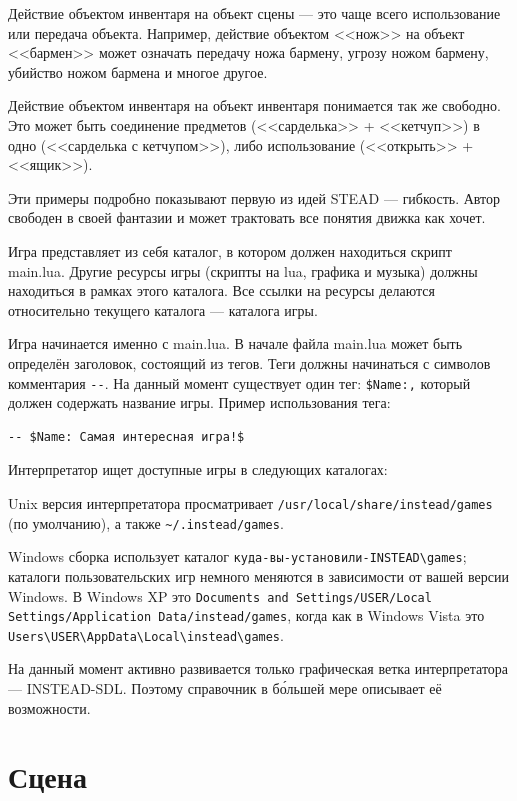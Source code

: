 \documentclass[a4paper,12pt]{article}
\begin{document}
Действие объектом инвентаря на объект сцены --- это чаще всего использование или передача объекта. Например, действие объектом <<нож>> на объект <<бармен>> может означать передачу ножа бармену, угрозу ножом бармену, убийство ножом бармена и многое другое.

Действие объектом инвентаря на объект инвентаря понимается так же свободно. Это может быть соединение предметов (<<сарделька>> + <<кетчуп>>) в одно (<<сарделька с кетчупом>>), либо использование (<<открыть>> + <<ящик>>).

Эти примеры подробно показывают первую из идей STEAD --- гибкость. Автор свободен в своей фантазии и может трактовать все понятия движка как хочет.

Игра представляет из себя каталог, в котором должен находиться скрипт main.lua. Другие ресурсы игры (скрипты на lua, графика и музыка) должны находиться в рамках этого каталога. Все ссылки на ресурсы делаются относительно текущего каталога --- каталога игры.

Игра начинается именно с main.lua. В начале файла main.lua может быть определён заголовок, состоящий из тегов. Теги должны начинаться с символов комментария \verb/--/. На данный момент существует один тег: \verb/$Name:,/ который должен содержать название игры. Пример использования тега:

\begin{verbatim}
-- $Name: Самая интересная игра!$
\end{verbatim}

Интерпретатор ищет доступные игры в следующих каталогах:

Unix версия интерпретатора просматривает \verb;/usr/local/share/instead/games; (по умолчанию), а также \verb,~/.instead/games,.

Windows сборка использует каталог \verb/куда-вы-установили-INSTEAD\games/; каталоги пользовательских игр немного меняются в зависимости от вашей версии Windows. В Windows XP это \texttt{Documents and Settings/USER/Local Settings/Application Data/instead/games}, когда как в Windows Vista это \verb;Users\USER\AppData\Local\instead\games;.

На данный момент активно развивается только графическая ветка интерпретатора --- INSTEAD-SDL. Поэтому справочник в б\'{о}льшей мере описывает её возможности.

\section{Сцена}
\end{document}
